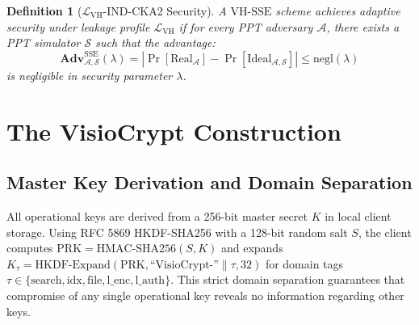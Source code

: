 \documentclass[10pt,conference]{IEEEtran}
\newenvironment{revised}{\color{revcolor}}{}
\newtheorem{definition}{Definition}
\newenvironment{revised}{\color{revcolor}}{}
\begin{document}
\begin{revised}
\begin{definition}[$\mathcal{L}_{\text{VH}}$-IND-CKA2 Security]
A $\text{VH-SSE}$ scheme achieves adaptive security under leakage profile $\mathcal{L}_{\text{VH}}$ if for every PPT adversary $\mathcal{A}$, there exists a PPT simulator $\mathcal{S}$ such that the advantage:
\begin{equation}
\mathbf{Adv}_{\mathcal{A},\mathcal{S}}^{\text{SSE}}(\lambda) = \left| \Pr[\text{Real}_{\mathcal{A}}] - \Pr[\text{Ideal}_{\mathcal{A},\mathcal{S}}] \right| \le \text{negl}(\lambda)
\end{equation}
is negligible in security parameter $\lambda$.
\end{definition}

\section{The VisioCrypt Construction}
\subsection{Master Key Derivation and Domain Separation}
All operational keys are derived from a 256-bit master secret $K$ in local client storage. Using RFC 5869 HKDF-SHA256 with a 128-bit random salt $S$, the client computes $\text{PRK} = \text{HMAC-SHA256}(S, K)$ and expands $K_{\tau} = \text{HKDF-Expand}(\text{PRK}, \text{``VisioCrypt-''}\parallel \tau, 32)$ for domain tags $\tau \in \{\text{search}, \text{idx}, \text{file}, \text{l\_enc}, \text{l\_auth}\}$. This strict domain separation guarantees that compromise of any single operational key reveals no information regarding other keys.


\end{revised}
\end{document}
